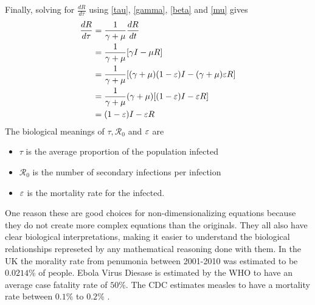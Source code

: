Finally, solving for $\frac{dR}{d\tau}$ using \ref{tau}, \ref{gamma}, \ref{beta} and \ref{mu} gives
\begin{align*}
    \frac{dR}{d\tau} &= \frac{1}{\gamma+\mu}\frac{dR}{dt}\nonumber\\
     &= \frac{1}{\gamma+\mu}[\gamma I - \mu R]\nonumber\\
     &= \frac{1}{\gamma+\mu}[(\gamma+\mu)(1-\varepsilon)I - (\gamma+\mu)\varepsilon R]\nonumber\\
     &= \frac{1}{\gamma+\mu}(\gamma+\mu)[(1-\varepsilon)I - \varepsilon R]\nonumber\\
     &= (1-\varepsilon)I - \varepsilon R
\end{align*}
The biological meanings of $\tau, {\mathcal R_0}$ and $\varepsilon$ are
\begin{itemize}
    \item $\tau$ is the average proportion of the population infected
    \item ${\mathcal R_0}$ is the number of secondary infections per infection
    \item $\varepsilon$ is the mortality rate for the infected.
\end{itemize}
One reason these are good choices for non-dimensionalizing equations because they do not create more complex equations than the originals.
They all also have clear biological interpretations, making it easier to understand the biological relationships represeted by any mathematical reasoning done with them.
In the UK the morality rate from penumonia between 2001-2010 was estimated to be $0.0214\%$ of people\cite{pneu}.
Ebola Virus Diesase is estimated by the WHO to have an average case fatality rate of $50\%$\cite{ebola}.
The CDC estimates measles to have a mortality rate between $0.1\%$ to $0.2\%$ \cite{meas}.
